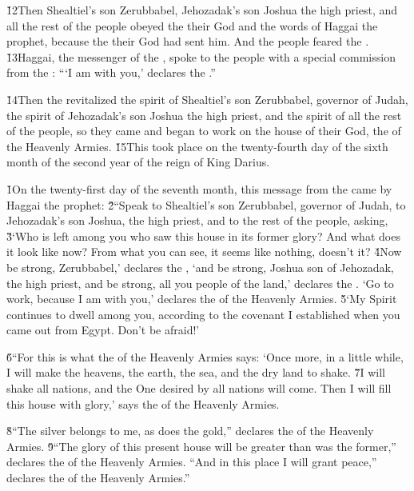 \v{12}Then Shealtiel's son Zerubbabel, Jehozadak's son Joshua the high priest, and all the rest of the people obeyed the  their God and the words of Haggai the prophet, because the  their God had sent him. And the people feared the . \v{13}Haggai, the messenger of the , spoke to the people with a special commission from the : ```I am with you,' declares the .''

\v{14}Then the  revitalized the spirit of Shealtiel's son Zerubbabel, governor of Judah, the spirit of Jehozadak's son Joshua the high priest, and the spirit of all the rest of the people, so they came and began to work on the house of their God, the  of the Heavenly Armies. \v{15}This took place on the twenty-fourth day of the sixth month of the second year of the reign of King Darius.

\v{1}On the twenty-first day of the seventh month, this message from the  came by Haggai the prophet: \v{2}``Speak to Shealtiel's son Zerubbabel, governor of Judah, to Jehozadak's son Joshua, the high priest, and to the rest of the people, asking, \v{3}`Who is left among you who saw this house in its former glory? And what does it look like now? From what you can see, it seems like nothing, doesn't it? \v{4}Now be strong, Zerubbabel,' declares the , `and be strong, Joshua son of Jehozadak, the high priest, and be strong, all you people of the land,' declares the . `Go to work, because I am with you,' declares the  of the Heavenly Armies. \v{5}`My Spirit continues to dwell among you, according to the covenant I established when you came out from Egypt. Don't be afraid!'

\v{6}``For this is what the  of the Heavenly Armies says: `Once more, in a little while, I will make the heavens, the earth, the sea, and the dry land to shake. \v{7}I will shake all nations, and the One desired by all nations will come. Then I will fill this house with glory,' says the  of the Heavenly Armies.

\v{8}``The silver belongs to me, as does the gold,'' declares the  of the Heavenly Armies. \v{9}``The glory of this present house will be greater than was the former,'' declares the  of the Heavenly Armies. ``And in this place I will grant peace,'' declares the  of the Heavenly Armies.''


